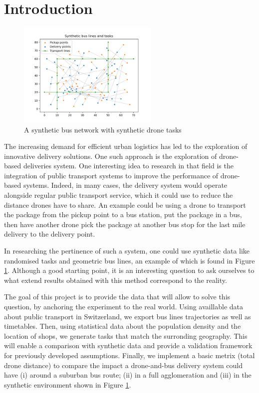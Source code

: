 \section*{Introduction}
\label{sec:introduction}

\begin{figure}
    \centering
    \includegraphics[width=0.6\textwidth]{../fig/synthetic_tasks.png}
    \caption{A synthetic bus network with synthetic drone tasks}
    \label{fig:intro}
\end{figure}

The increasing demand for efficient urban logistics has led to the exploration of innovative delivery solutions. One such approach is the exploration of drone-based deliveries system. One interesting idea to research in that field is the integration of public transport systems to improve the performance of drone-based systems. Indeed, in many cases, the delivery system would operate alongside regular public transport service, which it could use to reduce the distance drones have to share. An example could be using a drone to transport the package from the pickup point to a bus station, put the package in a bus, then have another drone pick the package at another bus stop for the last mile delivery to the delivery point. 

In researching the pertinence of such a system, one could use synthetic data like randomised tasks and geometric bus lines, an example of which is found in Figure \ref{fig:intro}. Although a good starting point, it is an interesting question to ask ourselves to what extend results obtained with this method correspond to the reality.

The goal of this project is to provide the data that will allow to solve this question, by anchoring the experiment to the real world. Using availlable data about public transport in Switzerland, we export bus lines trajectories as well as timetables. Then, using statistical data about the population density and the location of shops, we generate tasks that match the surronding geography. This will enable a comparison with synthetic data and provide a validation framework for previously developed assumptions. Finally, we implement a basic metrix (total drone distance) to compare the impact a drone-and-bus delivery system could have (i) around a suburban bus route; (ii) in a full agglomeration and (iii) in the synthetic environment shown in Figure \ref{fig:intro}.

